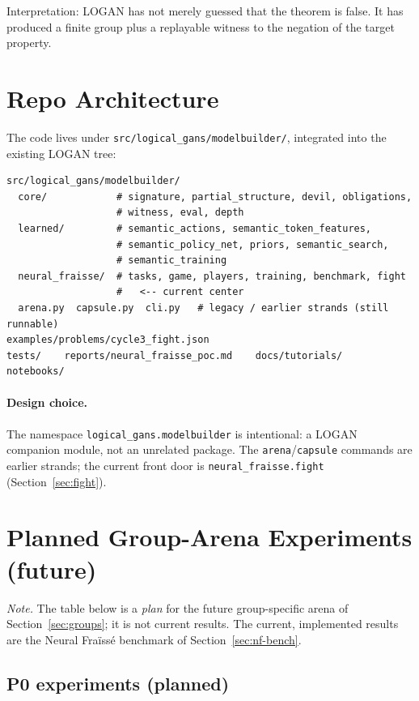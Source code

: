 \documentclass[11pt]{article}
\newcommand{\LOGAN}{\textsc{LOGAN}}
\begin{document}
Interpretation: \LOGAN{} has not merely guessed that the theorem is false.  It has produced a finite group plus a replayable witness to the negation of the target property.

\section{Repo Architecture}

The code lives under \texttt{src/logical\_gans/modelbuilder/}, integrated into the existing LOGAN tree:

\begin{lstlisting}[basicstyle=\ttfamily\small]
src/logical_gans/modelbuilder/
  core/            # signature, partial_structure, devil, obligations,
                   # witness, eval, depth
  learned/         # semantic_actions, semantic_token_features,
                   # semantic_policy_net, priors, semantic_search,
                   # semantic_training
  neural_fraisse/  # tasks, game, players, training, benchmark, fight
                   #   <-- current center
  arena.py  capsule.py  cli.py   # legacy / earlier strands (still runnable)
examples/problems/cycle3_fight.json
tests/    reports/neural_fraisse_poc.md    docs/tutorials/    notebooks/
\end{lstlisting}

\paragraph{Design choice.}
The namespace \texttt{logical\_gans.modelbuilder} is intentional: a LOGAN companion module, not an unrelated package.  The \texttt{arena}/\texttt{capsule} commands are earlier strands; the current front door is \texttt{neural\_fraisse.fight} (Section~\ref{sec:fight}).

\section{Planned Group-Arena Experiments (future)}

\emph{Note.} The table below is a \emph{plan} for the future group-specific arena of Section~\ref{sec:groups}; it is not current results.  The current, implemented results are the Neural Fra\"iss\'e benchmark of Section~\ref{sec:nf-bench}.

\subsection{P0 experiments (planned)}
\end{document}
